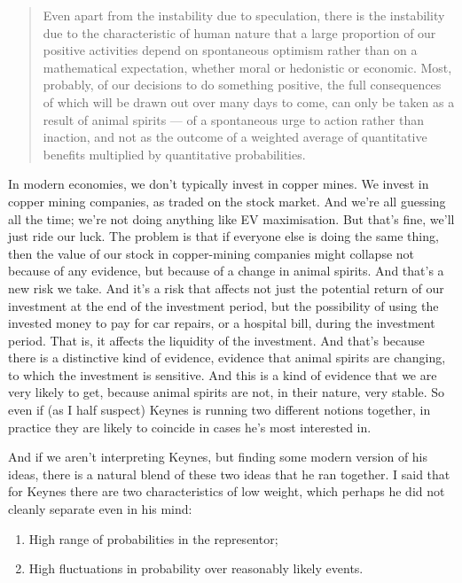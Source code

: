 \documentclass[
  11pt,
  letterpaper,
  DIV=11,
  numbers=noendperiod,
  oneside]{scrartcl}
\providecommand{\tightlist}{%
  \setlength{\itemsep}{0pt}\setlength{\parskip}{0pt}}\usepackage{longtable,booktabs,array}
\begin{document}
\begin{quote}
Even apart from the instability due to speculation, there is the
instability due to the characteristic of human nature that a large
proportion of our positive activities depend on spontaneous optimism
rather than on a mathematical expectation, whether moral or hedonistic
or economic. Most, probably, of our decisions to do something positive,
the full consequences of which will be drawn out over many days to come,
can only be taken as a result of animal spirits --- of a spontaneous
urge to action rather than inaction, and not as the outcome of a
weighted average of quantitative benefits multiplied by quantitative
probabilities.
\end{quote}

In modern economies, we don't typically invest in copper mines. We
invest in copper mining companies, as traded on the stock market. And
we're all guessing all the time; we're not doing anything like EV
maximisation. But that's fine, we'll just ride our luck. The problem is
that if everyone else is doing the same thing, then the value of our
stock in copper-mining companies might collapse not because of any
evidence, but because of a change in animal spirits. And that's a new
risk we take. And it's a risk that affects not just the potential return
of our investment at the end of the investment period, but the
possibility of using the invested money to pay for car repairs, or a
hospital bill, during the investment period. That is, it affects the
liquidity of the investment. And that's because there is a distinctive
kind of evidence, evidence that animal spirits are changing, to which
the investment is sensitive. And this is a kind of evidence that we are
very likely to get, because animal spirits are not, in their nature,
very stable. So even if (as I half suspect) Keynes is running two
different notions together, in practice they are likely to coincide in
cases he's most interested in.

And if we aren't interpreting Keynes, but finding some modern version of
his ideas, there is a natural blend of these two ideas that he ran
together. I said that for Keynes there are two characteristics of low
weight, which perhaps he did not cleanly separate even in his mind:

\begin{enumerate}
\def\labelenumi{\arabic{enumi}.}
\tightlist
\item
  High range of probabilities in the representor;
\item
  High fluctuations in probability over reasonably likely events.
\end{enumerate}
\end{document}
